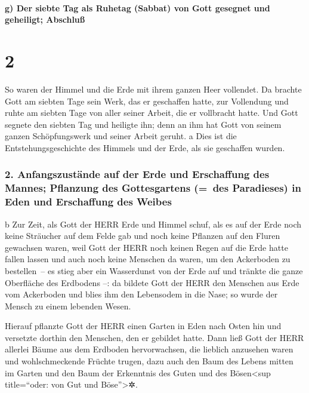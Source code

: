 \hypertarget{g-der-siebte-tag-als-ruhetag-sabbat-von-gott-gesegnet-und-geheiligt-abschluuxdf}{%
\paragraph{g) Der siebte Tag als Ruhetag (Sabbat) von Gott gesegnet und
geheiligt;
Abschluß}\label{g-der-siebte-tag-als-ruhetag-sabbat-von-gott-gesegnet-und-geheiligt-abschluuxdf}}

\hypertarget{section-1}{%
\section{2}\label{section-1}}

 So waren der Himmel und die Erde mit ihrem ganzen Heer
vollendet.  Da brachte Gott am siebten Tage sein Werk, das
er geschaffen hatte, zur Vollendung und ruhte am siebten Tage von aller
seiner Arbeit, die er vollbracht hatte.  Und Gott segnete
den siebten Tag und heiligte ihn; denn an ihm hat Gott von seinem ganzen
Schöpfungswerk und seiner Arbeit geruht.  a Dies ist die
Entstehungsgeschichte des Himmels und der Erde, als sie geschaffen
wurden.

\hypertarget{anfangszustuxe4nde-auf-der-erde-und-erschaffung-des-mannes-pflanzung-des-gottesgartens-des-paradieses-in-eden-und-erschaffung-des-weibes}{%
\subsubsection{2. Anfangszustände auf der Erde und Erschaffung des
Mannes; Pflanzung des Gottesgartens (=~des Paradieses) in Eden und
Erschaffung des
Weibes}\label{anfangszustuxe4nde-auf-der-erde-und-erschaffung-des-mannes-pflanzung-des-gottesgartens-des-paradieses-in-eden-und-erschaffung-des-weibes}}

b Zur Zeit, als Gott der HERR Erde und Himmel schuf,  als
es auf der Erde noch keine Sträucher auf dem Felde gab und noch keine
Pflanzen auf den Fluren gewachsen waren, weil Gott der HERR noch keinen
Regen auf die Erde hatte fallen lassen und auch noch keine Menschen da
waren, um den Ackerboden zu bestellen~--  es stieg aber
ein Wasserdunst von der Erde auf und tränkte die ganze Oberfläche des
Erdbodens --:  da bildete Gott der HERR den Menschen aus
Erde vom Ackerboden und blies ihm den Lebensodem in die Nase; so wurde
der Mensch zu einem lebenden Wesen.

 Hierauf pflanzte Gott der HERR einen Garten in Eden nach
Osten hin und versetzte dorthin den Menschen, den er gebildet hatte.
 Dann ließ Gott der HERR allerlei Bäume aus dem Erdboden
hervorwachsen, die lieblich anzusehen waren und wohlschmeckende Früchte
trugen, dazu auch den Baum des Lebens mitten im Garten und den Baum der
Erkenntnis des Guten und des Bösen\textless sup title=``oder: von Gut
und Böse''\textgreater✲.

